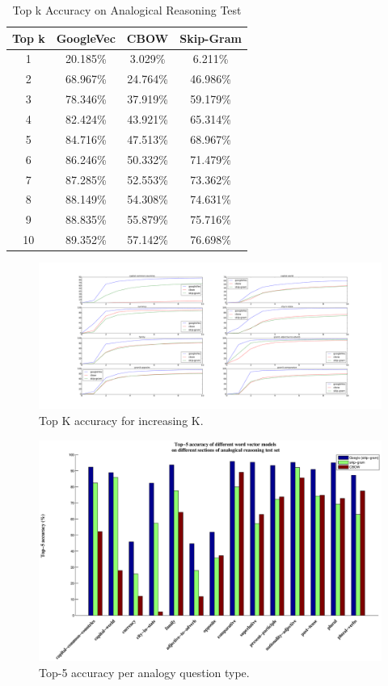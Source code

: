 \begin{table}[h]
	\caption{Top k Accuracy on Analogical Reasoning Test}
	\label{tab:analogical_acc}
	\centering
    \begin{tabular}{| c | c | c | c |}
    \hline
    \textbf{Top k} & \textbf{GoogleVec} & \textbf{CBOW} & \textbf{Skip-Gram}\\ \hline
    1 & 20.185\% & 3.029\% & 6.211\%  \\ \hline
    2 & 68.967\% & 24.764\%& 46.986\% \\ \hline
    3 & 78.346\% & 37.919\%& 59.179\% \\ \hline
    4 & 82.424\% & 43.921\%& 65.314\% \\ \hline
    5 & 84.716\% & 47.513\%& 68.967\% \\ \hline
    6 & 86.246\% & 50.332\%& 71.479\% \\ \hline
    7 & 87.285\% & 52.553\%& 73.362\% \\ \hline
    8 & 88.149\% & 54.308\%& 74.631\% \\ \hline
    9 & 88.835\% & 55.879\%& 75.716\% \\ \hline
    10 & 89.352\% & 57.142\%& 76.698\% \\ \hline
    \end{tabular}
\end{table}


\begin{figure}[h]
\centering
\includegraphics[width=\textwidth]{./images/top_k.pdf}
\caption{Top K accuracy for increasing K.}
\label{fig:top_k}
\end{figure}

\begin{figure}[h]
\centering
\includegraphics[width=\textwidth]{./images/analog_accuracy_per_question.eps}
\caption{Top-5 accuracy per analogy question type.}
\label{fig:accuracy_per_question}
\end{figure}


